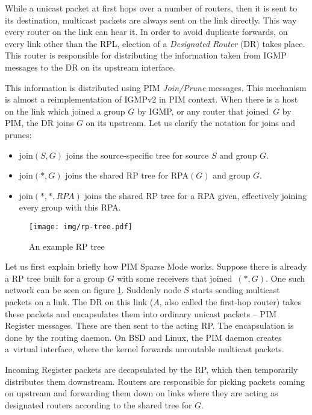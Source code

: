 While a unicast packet at first hops over a number of routers, then it is sent to
its destination, multicast packets are always sent on the link directly. This
way every router on the link can hear it. In order to avoid duplicate forwards, on
every link other than the RPL, election of a \emph{Designated Router} (DR)
takes place. This router is responsible for distributing
the information taken from IGMP messages to the DR on its upstream interface.

\pagebreak[4]

This information is distributed using PIM \emph{Join/Prune} messages. This
mechanism is almost a reimplementation of IGMPv2 in PIM context. When there is
a host on the link which joined a group $G$ by IGMP, or any router that joined~$G$ by
PIM, the DR joins $G$ on its upstream. Let us clarify the notation for joins and prunes:

\begin{itemize}
  \item join$(S, G)$ joins the source-specific tree for source $S$ and group $G$.
  \item join$(*, G)$ joins the shared RP tree for RPA$(G)$ and group $G$.
  \item join$(*, *, RPA)$ joins the shared RP tree for a RPA given, effectively
    joining every group with this RPA.
\end{itemize}

\begin{figure}[htp]
\centering
\texttt{[image: img/rp-tree.pdf]}
\caption{An example RP tree}
\label{rp-tree}
\end{figure}

Let us first explain briefly how PIM Sparse Mode works. Suppose there is
already a RP tree built for a group $G$ with some receivers that joined~$(*,G)$.
One such network can be seen on figure \ref{rp-tree}.
Suddenly node $S$ starts sending multicast packets on a link. The DR on
this link ($A$, also called the first-hop router) takes these packets and
encapsulates them into ordinary unicast packets -- PIM Register messages. These
are then sent to the acting RP. The encapsulation is done by the routing
daemon. On BSD and Linux, the PIM daemon creates a~virtual interface, where the
kernel forwards unroutable multicast packets.

Incoming Register packets are decapsulated by the RP, which then temporarily
distributes them downstream. Routers are responsible for picking packets coming
on upstream and forwarding them down on links where they are acting as
designated routers according to the shared tree for $G$.

